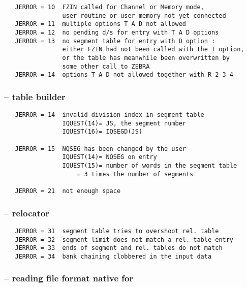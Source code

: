 \begin{verbatim}
   JERROR = 10  FZIN called for Channel or Memory mode,
                user routine or user memory not yet connected
   JERROR = 11  multiple options T A D not allowed
   JERROR = 12  no pending d/s for entry with T A D options
   JERROR = 13  no segment table for entry with D option :
                either FZIN had not been called with the T option,
                or the table has meanwhile been overwritten by
                some other call to ZEBRA
   JERROR = 14  options T A D not allowed together with R 2 3 4
\end{verbatim}

\subsubsection*{ -- table builder}

\begin{verbatim}
   JERROR = 14  invalid division index in segment table
                IQUEST(14)= JS, the segment number
                IQUEST(16)= IQSEGD(JS)

   JERROR = 15  NQSEG has been changed by the user
                IQUEST(14)= NQSEG on entry
                IQUEST(15)= number of words in the segment table
                    = 3 times the number of segments

   JERROR = 21  not enough space
\end{verbatim}

\subsubsection*{ -- relocator}

\begin{verbatim}
   JERROR = 31  segment table tries to overshoot rel. table
   JERROR = 32  segment limit does not match a rel. table entry
   JERROR = 33  ends of segment and rel. tables do not match
   JERROR = 34  bank chaining clobbered in the input data
\end{verbatim}

\subsubsection*{ -- reading file format native for }

